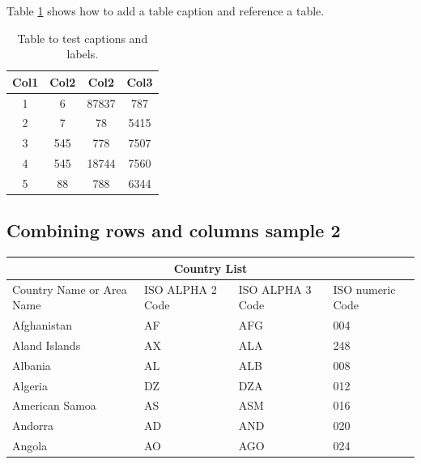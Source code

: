 \documentclass{article}
\begin{document}
  Table \ref{table:data} shows how to add a table caption and reference a table.
  \begin{table}[h!]
  	\centering
  	\begin{tabular}{||c c c c||} 
  		\hline
  		Col1 & Col2 & Col2 & Col3 \\ [0.5ex] 
  		\hline\hline
  		1 & 6 & 87837 & 787 \\ 
  		2 & 7 & 78 & 5415 \\
  		3 & 545 & 778 & 7507 \\
  		4 & 545 & 18744 & 7560 \\
  		5 & 88 & 788 & 6344 \\ [1ex] 
  		\hline
  	\end{tabular}
  	\caption{Table to test captions and labels.}
  	\label{table:data}
  \end{table}
  
 \subsection*{Combining rows and columns sample 2}
  
  \begin{tabular}{ |p{3cm}||p{3cm}|p{3cm}|p{3cm}|  }
  	\hline
  	\multicolumn{4}{|c|}{Country List} \\
  	\hline
  	Country Name or Area Name& ISO ALPHA 2 Code &ISO ALPHA 3 Code&ISO numeric Code\\
  	\hline
  	Afghanistan   & AF    &AFG&   004\\
  	Aland Islands&   AX  & ALA   &248\\
  	Albania &AL & ALB&  008\\
  	Algeria    &DZ & DZA&  012\\
  	American Samoa&   AS  & ASM&016\\
  	Andorra& AD  & AND   &020\\
  	Angola& AO  & AGO&024\\
  	\hline
  \end{tabular}
  
\end{document}
